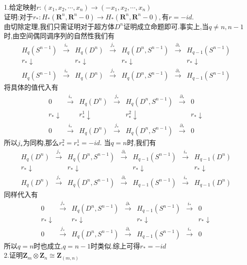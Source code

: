 \documentclass[b5paper]{ctexart}
\begin{document}
\pagestyle{plain}
\noindent
1.给定映射$r:(x_1,x_2,\cdots,x_n)\rightarrow (-x_1,x_2,\cdots,x_n)$\\
证明:对于$r_*:H_*(\mathbf{R}^n,\mathbf{R}^n-0)\rightarrow H_*(\mathbf{R}^n,\mathbf{R}^n-0),$有$r=-id$.\\
由切除定理,我们只需证明对于超方体$D^n$证明成立命题即可.事实上,当$q\neq n,n-1$时,由空间偶同调序列的自然性我们有
\[
\begin{array}{ccccccc}
H_q(S^{n-1})&\xrightarrow{i_*} & H_q(D^n)&\xrightarrow{j_*}& H_q(D^n,S^{n-1})&\xrightarrow{\partial_*}& H_{q-1}(S^{n-1})\\
r_*\downarrow& & r_*\downarrow& & r_*\downarrow& & r_*\downarrow\\
H_q(S^{n-1})&\xrightarrow{i_*} & H_q(D^n)&\xrightarrow{j_*}& H_q(D^n,S^{n-1})&\xrightarrow{\partial_*}& H_{q-1}(S^{n-1})
\end{array}\]
将具体的值代入有
\[
\begin{array}{ccccccc}
0&\xrightarrow{i_*} & H_q(D^n)&\xrightarrow{j_*}& H_q(D^n,S^{n-1})&\xrightarrow{\partial_*}& 0\\
r_*\downarrow& & r_*^1\downarrow& & r_*^2\downarrow& & r_*\downarrow\\
0&\xrightarrow{i_*} & H_q(D^n)&\xrightarrow{j_*}& H_q(D^n,S^{n-1})&\xrightarrow{\partial_*}& 0
\end{array}\]
所以$j_*$为同构,那么$r_*^2=r_*^1=-id$.
当$q=n$时,我们有
\[
\begin{array}{ccccccc}
 H_q(D^n)&\xrightarrow{j_*}& H_q(D^n,S^{n-1})&\xrightarrow{\partial_*}& H_{q-1}(S^{n-1})&\xrightarrow{i_*} &H_{q-1}(D^n)\\
r_*\downarrow& & r_*\downarrow& & r_*\downarrow& & r_*\downarrow\\
 H_q(D^n)&\xrightarrow{j_*}& H_q(D^n,S^{n-1})&\xrightarrow{\partial_*}& H_{q-1}(S^{n-1})&\xrightarrow{i_*} &H_{q-1}(D^n)
\end{array}\]
同样代入有
\[\begin{array}{ccccccc}
 0&\xrightarrow{j_*}& H_q(D^n,S^{n-1})&\xrightarrow{\partial_*}& H_{q-1}(S^{n-1})&\xrightarrow{i_*} & 0\\
r_*\downarrow& & r_*\downarrow& & r_*\downarrow& & r_*\downarrow\\
 0&\xrightarrow{j_*}& H_q(D^n,S^{n-1})&\xrightarrow{\partial_*}& H_{q-1}(S^{n-1})&\xrightarrow{i_*} & 0
\end{array}\]
所以$q=n$时也成立,$q=n-1$时类似.综上可得$r_*=-id$\\
2.证明$\mathbf{Z}_m\otimes \mathbf{Z}_n\cong  \mathbf{Z}_{(m,n)}$\\
\end{document}
